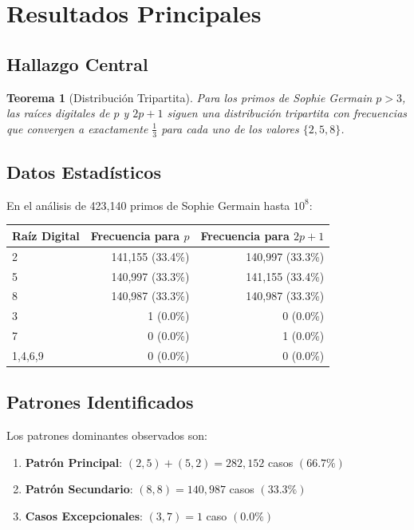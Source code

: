 \documentclass[11pt,a4paper]{article}
\newtheorem{theorem}{Teorema}
\theoremstyle{definition}
\theoremstyle{remark}
\begin{document}
\section{Resultados Principales}

\subsection{Hallazgo Central}

\begin{theorem}[Distribución Tripartita]
Para los primos de Sophie Germain $p > 3$, las raíces digitales de $p$ y $2p+1$ siguen una distribución tripartita con frecuencias que convergen a exactamente $\frac{1}{3}$ para cada uno de los valores $\{2, 5, 8\}$.
\end{theorem}

\subsection{Datos Estadísticos}

En el análisis de 423,140 primos de Sophie Germain hasta $10^8$:

\begin{center}
\begin{tabular}{@{}lrr@{}}
\toprule
\textbf{Raíz Digital} & \textbf{Frecuencia para $p$} & \textbf{Frecuencia para $2p+1$} \\
\midrule
2 & 141,155 (33.4\%) & 140,997 (33.3\%) \\
5 & 140,997 (33.3\%) & 141,155 (33.4\%) \\
8 & 140,987 (33.3\%) & 140,987 (33.3\%) \\
3 & 1 (0.0\%) & 0 (0.0\%) \\
7 & 0 (0.0\%) & 1 (0.0\%) \\
1,4,6,9 & 0 (0.0\%) & 0 (0.0\%) \\
\bottomrule
\end{tabular}
\end{center}

\subsection{Patrones Identificados}

Los patrones dominantes observados son:

\begin{enumerate}
    \item \textbf{Patrón Principal}: $(2,5) + (5,2) = 282,152$ casos $(66.7\%)$
    \item \textbf{Patrón Secundario}: $(8,8) = 140,987$ casos $(33.3\%)$
    \item \textbf{Casos Excepcionales}: $(3,7) = 1$ caso $(0.0\%)$
\end{enumerate}
\end{document}
